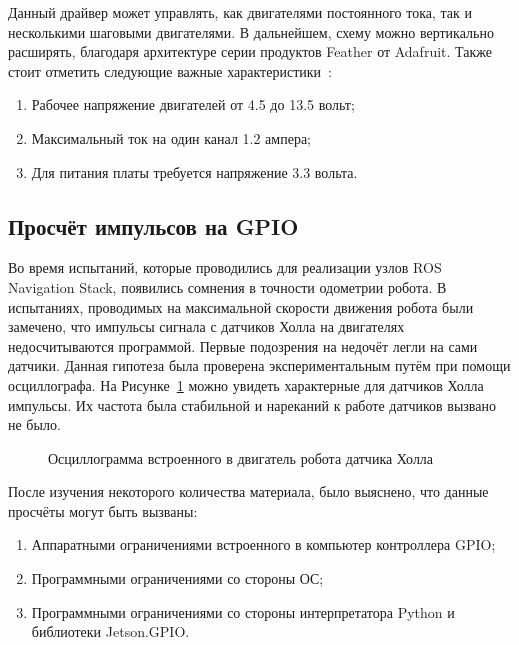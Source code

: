 Данный драйвер может управлять, как двигателями постоянного тока, так и несколькими шаговыми двигателями. В дальнейшем, схему можно вертикально расширять, благодаря архитектуре серии продуктов Feather от Adafruit. Также стоит отметить следующие важные характеристики~\cite{adafruit}:

\begin{enumerate}[beginpenalty=10000] %
  \item Рабочее напряжение двигателей от 4.5 до 13.5 вольт;
  \item Максимальный ток на один канал 1.2 ампера;
  \item Для питания платы требуется напряжение 3.3 вольта.
\end{enumerate}

\subsection{Просчёт импульсов на GPIO}
Во время испытаний, которые проводились для реализации узлов ROS Navigation Stack, появились сомнения в точности одометрии робота. В испытаниях, проводимых на максимальной скорости движения робота были замечено, что импульсы сигнала с датчиков Холла на двигателях недосчитываются программой. Первые подозрения на недочёт легли на сами датчики. Данная гипотеза была проверена экспериментальным путём при помощи осциллографа. На Рисунке~\cref{fig:hole-signal} можно увидеть характерные для датчиков Холла импульсы. Их частота была стабильной и нареканий к работе датчиков вызвано не было.

\begin{figure}[ht]
    \caption{Осциллограмма встроенного в двигатель робота датчика Холла}\label{fig:hole-signal}
\end{figure}
 
После изучения некоторого количества материала, было выяснено, что данные просчёты могут быть вызваны:

\begin{enumerate}[beginpenalty=10000] %
  \item Аппаратными ограничениями встроенного в компьютер контроллера GPIO;
  \item Программными ограничениями со стороны ОС;
  \item Программными ограничениями со стороны интерпретатора Python и библиотеки Jetson.GPIO.
\end{enumerate}

